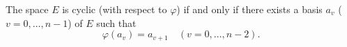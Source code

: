 The space $E$ is cyclic (with respect to $\varphi$) if and only if there exists a basis $a_v$ ($v = 0, \ldots, n-1$) of $E$ such that
$$\varphi(a_v) = a_{v+1} \quad (v = 0, \ldots, n-2).$$
